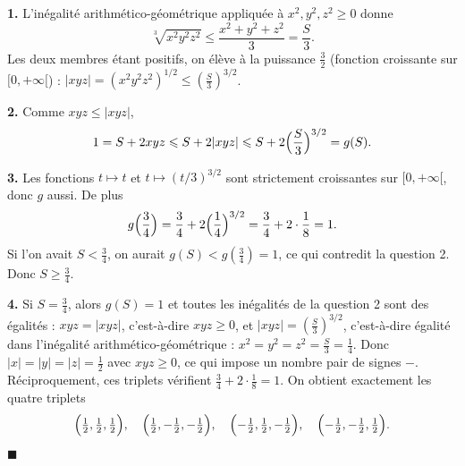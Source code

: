 \textbf{1.} L'inégalité arithmético-géométrique appliquée à $x^2, y^2, z^2 \geqslant 0$ donne
\[
\sqrt[3]{x^2 y^2 z^2} \leqslant \frac{x^2 + y^2 + z^2}{3} = \frac S3 .
\]
Les deux membres étant positifs, on élève à la puissance $\frac32$
(fonction croissante sur $[0, +\infty[$) :
$|xyz| = \left(x^2y^2z^2\right)^{1/2} \leqslant \left(\frac S3\right)^{3/2}$.

\textbf{2.} Comme $xyz \leqslant |xyz|$,
\[
1 = S + 2xyz \leqslant S + 2|xyz| \leqslant S + 2\Bigl(\frac S3\Bigr)^{3/2} = g(S).
\]

\textbf{3.} Les fonctions $t \mapsto t$ et $t \mapsto (t/3)^{3/2}$ sont
strictement croissantes sur $[0, +\infty[$, donc $g$ aussi. De plus
\[
g\Bigl(\frac34\Bigr) = \frac34 + 2\Bigl(\frac14\Bigr)^{3/2} = \frac34 + 2 \cdot \frac18 = 1 .
\]
Si l'on avait $S < \frac34$, on aurait $g(S) < g\left(\frac34\right) = 1$,
ce qui contredit la question 2. Donc $S \geqslant \frac34$.

\textbf{4.} Si $S = \frac34$, alors $g(S) = 1$ et toutes les inégalités de la
question 2 sont des égalités : $xyz = |xyz|$, c'est-à-dire $xyz \geqslant 0$,
et $|xyz| = \left(\frac S3\right)^{3/2}$, c'est-à-dire égalité dans
l'inégalité arithmético-géométrique : $x^2 = y^2 = z^2 = \frac S3 = \frac14$.
Donc $|x| = |y| = |z| = \frac12$ avec $xyz \geqslant 0$, ce qui impose un
nombre pair de signes $-$. Réciproquement, ces triplets vérifient
$\frac34 + 2 \cdot \frac18 = 1$. On obtient exactement les quatre triplets
\[
\Bigl(\tfrac12, \tfrac12, \tfrac12\Bigr),\quad
\Bigl(\tfrac12, -\tfrac12, -\tfrac12\Bigr),\quad
\Bigl(-\tfrac12, \tfrac12, -\tfrac12\Bigr),\quad
\Bigl(-\tfrac12, -\tfrac12, \tfrac12\Bigr).
\]
\hfill $\blacksquare$
